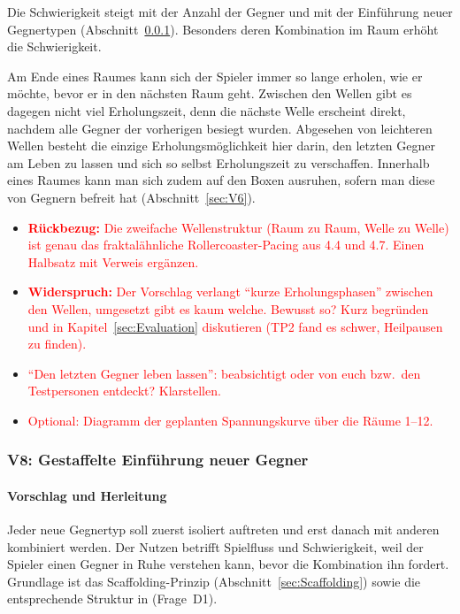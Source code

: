 \documentclass[../Main.tex]{subfiles}
\begin{document}
Die Schwierigkeit steigt mit der Anzahl der Gegner und mit der Einführung neuer Gegnertypen (Abschnitt~\ref{sec:V8}). Besonders deren Kombination im Raum erhöht die Schwierigkeit.

Am Ende eines Raumes kann sich der Spieler immer so lange erholen, wie er möchte, bevor er in den nächsten Raum geht. Zwischen den Wellen gibt es dagegen nicht viel Erholungszeit, denn die nächste Welle erscheint direkt, nachdem alle Gegner der vorherigen besiegt wurden. Abgesehen von leichteren Wellen besteht die einzige Erholungsmöglichkeit hier darin, den letzten Gegner am Leben zu lassen und sich so selbst Erholungszeit zu verschaffen. Innerhalb eines Raumes kann man sich zudem auf den Boxen ausruhen, sofern man diese von Gegnern befreit hat (Abschnitt~\ref{sec:V6}).

\begin{itemize}[leftmargin=1.5cm]
    \item \textcolor{red}{\textbf{Rückbezug:} Die zweifache Wellenstruktur (Raum zu Raum, Welle zu Welle) ist genau das fraktalähnliche Rollercoaster-Pacing aus 4.4 und 4.7. Einen Halbsatz mit Verweis ergänzen.}
    \item \textcolor{red}{\textbf{Widerspruch:} Der Vorschlag verlangt \enquote{kurze Erholungsphasen} zwischen den Wellen, umgesetzt gibt es kaum welche. Bewusst so? Kurz begründen und in Kapitel~\ref{sec:Evaluation} diskutieren (TP2 fand es schwer, Heilpausen zu finden).}
    \item \textcolor{red}{\enquote{Den letzten Gegner leben lassen}: beabsichtigt oder von euch bzw.\ den Testpersonen entdeckt? Klarstellen.}
    \item \textcolor{red}{Optional: Diagramm der geplanten Spannungskurve über die Räume 1--12.}
\end{itemize}

\subsubsection{V8: Gestaffelte Einführung neuer Gegner} \label{sec:V8}

\paragraph{Vorschlag und Herleitung}
Jeder neue Gegnertyp soll zuerst isoliert auftreten und erst danach mit anderen kombiniert werden. Der Nutzen betrifft Spielfluss und Schwierigkeit, weil der Spieler einen Gegner in Ruhe verstehen kann, bevor die Kombination ihn fordert. Grundlage ist das Scaffolding-Prinzip (Abschnitt~\ref{sec:Scaffolding}) sowie die entsprechende Struktur in  (Frage~D1).
\end{document}
